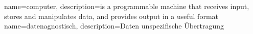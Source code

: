 {
  name=computer,
  description={is a programmable machine that receives input,
               stores and manipulates data, and provides
               output in a useful format}
}
{
	name=datenagnostisch,
	description={Daten unspezifische Übertragung}
}
